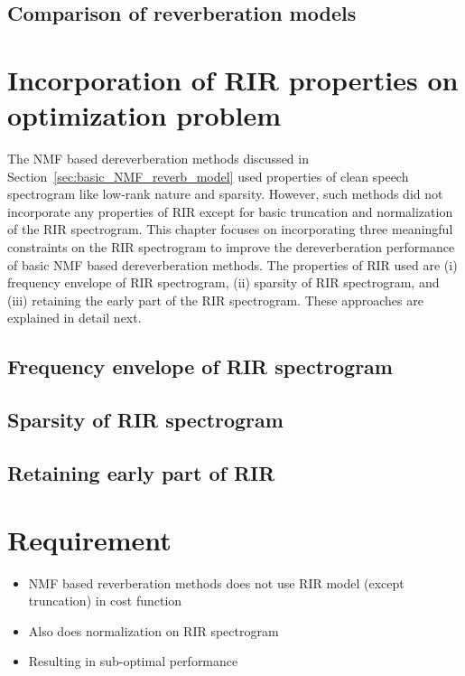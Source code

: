 \subsection{Comparison of reverberation models}

\section{Incorporation of RIR properties on optimization problem}
The NMF based dereverberation methods discussed in Section~\ref{sec:basic_NMF_reverb_model} used properties of clean speech spectrogram like low-rank nature and sparsity. However, such methods did not incorporate any properties of RIR except for basic truncation and normalization of the RIR spectrogram. This chapter focuses on incorporating three meaningful constraints on the RIR spectrogram to improve the dereverberation performance of basic NMF based dereverberation methods. The properties of RIR used are (i) frequency envelope of RIR spectrogram, (ii) sparsity of RIR spectrogram, and (iii) retaining the early part of the RIR spectrogram. These approaches are explained in detail next.

\subsection{Frequency envelope of RIR spectrogram}
\subsection{Sparsity of RIR spectrogram}
\subsection{Retaining early part of RIR}

\iffalse
\section{Requirement}
\begin{itemize}
\item NMF based reverberation methods does not use RIR model (except truncation) in cost function
\item Also does normalization on RIR spectrogram 
\item Resulting in sub-optimal performance
\end{itemize}
